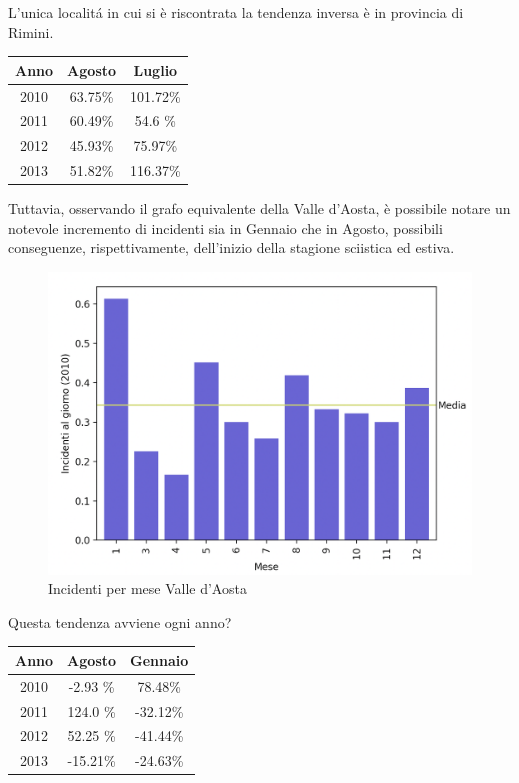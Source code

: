 \documentclass[a4paper]{report}
\begin{document}
L'unica localit\'a in cui si è riscontrata la tendenza inversa è in provincia 
di Rimini.

\begin{center}
    \def\arraystretch{1.5}%
    \begin{tabular}{ |c|c|c| } 
    \hline
    Anno & Agosto & Luglio \\ 
    \hline
    2010 & 63.75\% & 101.72\% \\ 
    2011 & 60.49\% & 54.6 \%  \\
    2012 & 45.93\% & 75.97\%  \\
    2013 & 51.82\% & 116.37\% \\
    \hline
    \end{tabular}
\end{center}

Tuttavia, osservando il grafo equivalente della Valle d'Aosta, è possibile notare 
un notevole incremento di incidenti sia in Gennaio che in Agosto, possibili 
conseguenze, rispettivamente, dell'inizio della stagione sciistica ed estiva.

\begin{figure}
    \includegraphics[width=\linewidth]{../src/incidenti/incidenti_senza_coords/mese_incidenti/aosta_mese.png}
    \caption{Incidenti per mese Valle d'Aosta}
    \label{fig:aosta}
\end{figure}

Questa tendenza avviene ogni anno?

\begin{center}
    \def\arraystretch{1.5}%
    \begin{tabular}{ |c|c|c| } 
    \hline
    Anno & Agosto & Gennaio \\ 
    \hline
    2010 & -2.93 \% & 78.48\%  \\ 
    2011 & 124.0 \% & -32.12\% \\
    2012 & 52.25 \% & -41.44\% \\
    2013 & -15.21\% & -24.63\% \\
    \hline
    \end{tabular}
\end{center}
\end{document}
